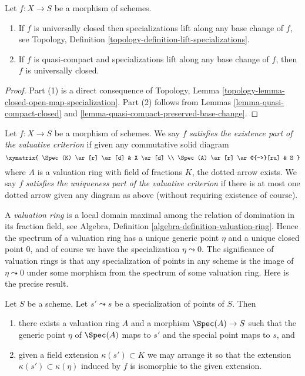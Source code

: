 \begin{lemma}
\label{lemma-specializations-lift}
Let $f : X \to S$ be a morphism of schemes.
\begin{enumerate}
\item If $f$ is universally closed then specializations lift
along any base change of $f$, see
Topology, Definition \ref{topology-definition-lift-specializations}.
\item If $f$ is quasi-compact and specializations lift
along any base change of $f$, then $f$ is universally closed.
\end{enumerate}
\end{lemma}

\begin{proof}
Part (1) is a direct consequence of
Topology, Lemma \ref{topology-lemma-closed-open-map-specialization}.
Part (2) follows from
Lemmas \ref{lemma-quasi-compact-closed} and
\ref{lemma-quasi-compact-preserved-base-change}.
\end{proof}

\begin{definition}
\label{definition-valuative-criterion}
Let $f : X \to S$ be a morphism of schemes. We say $f$
{\it satisfies the existence part of the valuative criterion}
if given any commutative solid diagram
$$
\xymatrix{
\Spec(K) \ar[r] \ar[d] & X \ar[d] \\
\Spec(A) \ar[r] \ar@{-->}[ru] & S
}
$$
where $A$ is a valuation ring with field of fractions $K$, the
dotted arrow exists. We say $f$ {\it satisfies the uniqueness
part of the valuative criterion} if there is at most one
dotted arrow given any diagram as above (without requiring
existence of course).
\end{definition}

\noindent
A {\it valuation ring} is a local domain maximal among the relation
of domination in its fraction field, see
Algebra, Definition \ref{algebra-definition-valuation-ring}.
Hence the spectrum of a valuation ring has a unique generic point
$\eta$ and a unique closed point $0$, and of course we have the
specialization $\eta \leadsto 0$.
The significance of valuation rings is that any specialization of
points in any scheme is the image of $\eta \leadsto 0$
under some morphism from the spectrum of some valuation ring.
Here is the precise result.

\begin{lemma}
\label{lemma-points-specialize}
Let $S$ be a scheme. Let $s' \leadsto s$ be a specialization of points of $S$.
Then
\begin{enumerate}
\item there exists a valuation ring $A$ and a morphism
$\Spec(A) \to S$ such that the generic point $\eta$ of
$\Spec(A)$ maps to $s'$ and the special point maps to $s$, and
\item given a field extension $\kappa(s') \subset K$
we may arrange it so that the extension
$\kappa(s') \subset \kappa(\eta)$ induced by $f$
is isomorphic to the given extension.
\end{enumerate}
\end{lemma}

